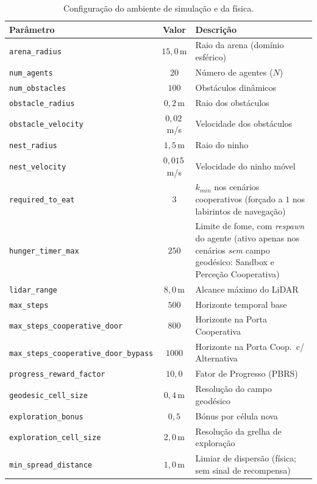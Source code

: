\documentclass[12pt,reqno, twoside]{amsbook}
\theoremstyle{plain}
\numberwithin{equation}{chapter}
\numberwithin{section}{chapter}
\numberwithin{table}{chapter}
\numberwithin{figure}{chapter}
\begin{document}
\begin{table}[!htbp]
\centering
\footnotesize
\renewcommand{\arraystretch}{1.15}
\caption[Configuração do ambiente de simulação e da física]{Configuração do ambiente de simulação e da física.}
\label{tab:apx_env}
\begin{tabular}{|l|c|p{6.6cm}|}
\hline
\textbf{Parâmetro} & \textbf{Valor} & \textbf{Descrição} \\ \hline
\texttt{arena\_radius} & $15{,}0$\,m & Raio da arena (domínio esférico) \\
\texttt{num\_agents} & $20$ & Número de agentes ($N$) \\
\texttt{num\_obstacles} & $100$ & Obstáculos dinâmicos \\
\texttt{obstacle\_radius} & $0{,}2$\,m & Raio dos obstáculos \\
\texttt{obstacle\_velocity} & $0{,}02$\,m/s & Velocidade dos obstáculos \\
\texttt{nest\_radius} & $1{,}5$\,m & Raio do ninho \\
\texttt{nest\_velocity} & $0{,}015$\,m/s & Velocidade do ninho móvel \\
\texttt{required\_to\_eat} & $3$ & $k_{min}$ nos cenários cooperativos (forçado a $1$ nos labirintos de navegação) \\
\texttt{hunger\_timer\_max} & $250$ & Limite de fome, com \textit{respawn} do agente (ativo apenas nos cenários \emph{sem} campo geodésico: Sandbox e Perceção Cooperativa) \\
\texttt{lidar\_range} & $8{,}0$\,m & Alcance máximo do LiDAR \\
\texttt{max\_steps} & $500$ & Horizonte temporal base \\
\texttt{max\_steps\_cooperative\_door} & $800$ & Horizonte na Porta Cooperativa \\
\texttt{max\_steps\_cooperative\_door\_bypass} & $1000$ & Horizonte na Porta Coop.\ c/ Alternativa \\
\texttt{progress\_reward\_factor} & $10{,}0$ & Fator de Progresso (PBRS) \\
\texttt{geodesic\_cell\_size} & $0{,}4$\,m & Resolução do campo geodésico \\
\texttt{exploration\_bonus} & $0{,}5$ & Bónus por célula nova \\
\texttt{exploration\_cell\_size} & $2{,}0$\,m & Resolução da grelha de exploração \\
\texttt{min\_spread\_distance} & $1{,}0$\,m & Limiar de dispersão (física; sem sinal de recompensa) \\

\end{tabular}
\end{table}
\end{document}
